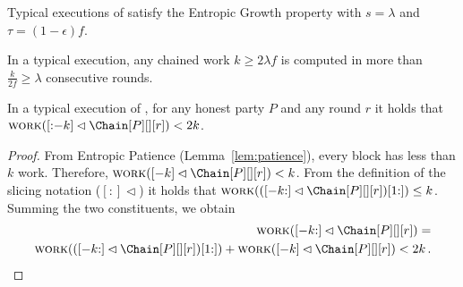 
\begin{theorem} \label{thm:entropic-growth} 
  Typical executions of \poem satisfy the Entropic Growth property
  with $s = \lambda$ and $\tau = (1 - \epsilon)f$.
\end{theorem}

\begin{conjecture} \label{lem:patience}
  In a typical execution, any chained work $k \geq 2 \lambda f$ is computed
  in more than $\frac{k}{2 f} \geq \lambda$ consecutive rounds.
\end{conjecture}

\begin{corollary} \label{cor:slicing-work-bound}
  In a typical execution of \poem, for any honest party $P$ and any round $r$ it holds that
  $\work([{:}{-k}] \lhd \Chain[P][][r]) < 2k$.
\end{corollary}
\begin{proof}
  From Entropic Patience (Lemma~\ref{lem:patience}), every block has less than $k$ work. Therefore,
  $\work([-k] \lhd \Chain[P][][r]) < k$.
  From the definition of the slicing notation ($[{:}]\lhd$)
  it holds that $\work(([-k{:}] \lhd \Chain[P][][r])[1{:}]) \leq k$. Summing the two constituents,
  we obtain
  \begin{align*}
    \work([-k{:}] \lhd \Chain[P][][r]) =\\
    \work(([-k{:}] \lhd \Chain[P][][r])[1{:}]) + \work([-k] \lhd \Chain[P][][r]) < 2k\,.
  \end{align*}
  \Qed
\end{proof}

